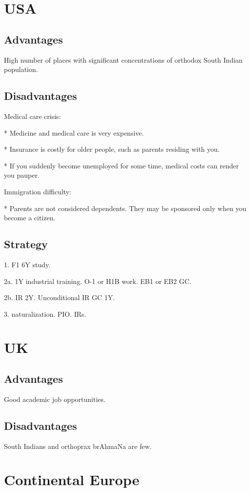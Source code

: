 \documentclass[oneside, article]{memoir}
\begin{document}
\section{USA}
\subsection{Advantages}
High number of places with significant concentrations of orthodox South Indian population.

\subsection{Disadvantages}

Medical care crisis:

    * Medicine and medical care is very expensive.

    * Insurance is costly for older people, such as parents residing with you.

    * If you suddenly become unemployed for some time, medical costs can render you pauper.

Immigration difficulty:

    * Parents are not considered dependents. They may be sponsored only when you become a citizen.

\subsection{Strategy}
1. F1 6Y study.

2a. 1Y industrial training. O-1 or H1B work. EB1 or EB2 GC.

2b. IR 2Y. Unconditional IR GC 1Y.

3. naturalization. PIO. IRs.

\section{UK}
\subsection{Advantages}

Good academic job opportunities.
\subsection{Disadvantages}

South Indians and orthoprax brAhmaNa are few.

\section{Continental Europe}
\end{document}
